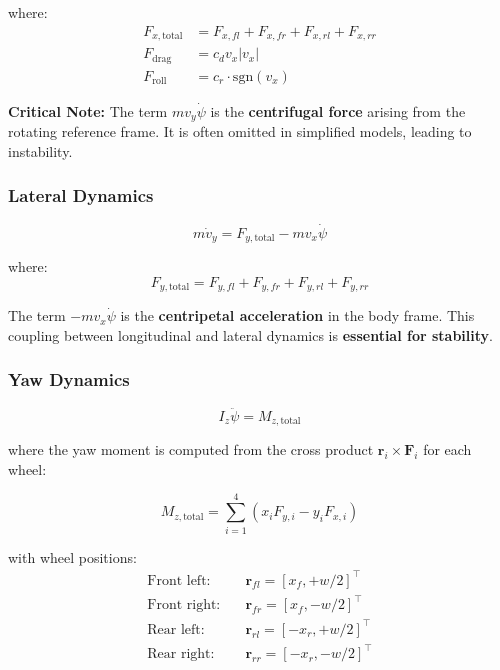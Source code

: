 \documentclass[11pt,a4paper]{article}
\begin{document}
where:
\begin{align}
F_{x,\text{total}} &= F_{x,fl} + F_{x,fr} + F_{x,rl} + F_{x,rr} \\
F_{\text{drag}} &= c_d v_x |v_x| \\
F_{\text{roll}} &= c_r \cdot \text{sgn}(v_x)
\end{align}

\textbf{Critical Note:} The term $m v_y \dot{\psi}$ is the \textbf{centrifugal force} arising from the rotating reference frame. It is often omitted in simplified models, leading to instability.

\subsubsection{Lateral Dynamics}

\begin{equation}
m \dot{v}_y = F_{y,\text{total}} - m v_x \dot{\psi}
\label{eq:lat_dynamics}
\end{equation}

where:
\begin{equation}
F_{y,\text{total}} = F_{y,fl} + F_{y,fr} + F_{y,rl} + F_{y,rr}
\end{equation}

The term $-m v_x \dot{\psi}$ is the \textbf{centripetal acceleration} in the body frame. This coupling between longitudinal and lateral dynamics is \textbf{essential for stability}.

\subsubsection{Yaw Dynamics}

\begin{equation}
I_z \ddot{\psi} = M_{z,\text{total}}
\label{eq:yaw_dynamics}
\end{equation}

where the yaw moment is computed from the cross product $\bm{r}_i \times \bm{F}_i$ for each wheel:

\begin{equation}
M_{z,\text{total}} = \sum_{i=1}^{4} (x_i F_{y,i} - y_i F_{x,i})
\label{eq:yaw_moment}
\end{equation}

with wheel positions:
\begin{align}
\text{Front left:} \quad &\bm{r}_{fl} = [x_f, +w/2]^\top \\
\text{Front right:} \quad &\bm{r}_{fr} = [x_f, -w/2]^\top \\
\text{Rear left:} \quad &\bm{r}_{rl} = [-x_r, +w/2]^\top \\
\text{Rear right:} \quad &\bm{r}_{rr} = [-x_r, -w/2]^\top
\end{align}
\end{document}

